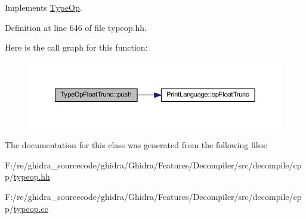 Implements \mbox{\hyperlink{class_type_op_ac9c9544203ed74dabe6ac662b653b2af}{Type\+Op}}.



Definition at line 646 of file typeop.\+hh.

Here is the call graph for this function\+:
\nopagebreak
\begin{figure}[H]
\begin{center}
\leavevmode
\includegraphics[width=350pt]{class_type_op_float_trunc_a1abcf620c37217e745f4bc6b17d1f4a2_cgraph}
\end{center}
\end{figure}


The documentation for this class was generated from the following files\+:\begin{DoxyCompactItemize}
\item 
F\+:/re/ghidra\+\_\+sourcecode/ghidra/\+Ghidra/\+Features/\+Decompiler/src/decompile/cpp/\mbox{\hyperlink{typeop_8hh}{typeop.\+hh}}\item 
F\+:/re/ghidra\+\_\+sourcecode/ghidra/\+Ghidra/\+Features/\+Decompiler/src/decompile/cpp/\mbox{\hyperlink{typeop_8cc}{typeop.\+cc}}\end{DoxyCompactItemize}
